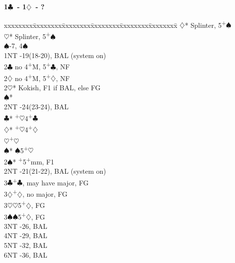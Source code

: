 \documentclass[10pt]{article}
\renewcommand{\c}{$\clubsuit$}
\renewcommand{\d}{$\diamondsuit$}
\newcommand{\h}{$\heartsuit$}
\newcommand{\s}{$\spadesuit$}
\newcommand{\p}{\textsuperscript{+}}
\newenvironment{bidtable}[1][]
{\textbf{#1}
  \begin{adjustwidth}{1em}{}
    \addvspace{2pt}
    \begin{tabbing}
      xxxxxxxx\=xxxxxxxx\=xxxxxxxx\=xxxxxxxx\=xxxxxxxx\=xxxxxxxx\=\kill}
{\end{tabbing}\end{adjustwidth}\bigskip}%
\begin{document}
\begin{multicols*}{2}
\begin{bidtable}[1\c\ - 1\d\ - ?]
     \d* \> Splinter, 5\p\s                    \\
     \h* \> Splinter, 5\p\s                    \\
     \s  {}-7, 4\s                           \\
1NT  -19(18-20), BAL (system on)              \\
2\c  \> no 4\p M, 5\p\c, NF                        \\
2\d  \> no 4\p M, 5\p\d, NF                        \\
2\h* \> Kokish, F1 if BAL, else FG                 \\
     \s* \>                                    \\
     \>      \> 2NT      -24(23-24), BAL      \\
     \>      \c*     {}\p\h 4\p\c            \\
     \>      \d*     {}\p\h 4\p\d            \\
     \>      \h      {}\p\h                  \\
     \>      \s*     {}\s 5\p\h              \\
2\s* {}\p 5\p mm, F1                             \\
2NT  -21(21-22), BAL (system on)              \\
3\c  {}\p\c, may have major, FG                  \\
3\d  {}\p\d, no major, FG                        \\
3\h  {}\h 5\p\d, FG                              \\
3\s  {}\s 5\p\d, FG                              \\
3NT  -26, BAL                                 \\
4NT  -29, BAL                                 \\
5NT  -32, BAL                                 \\
6NT  -36, BAL
\end{bidtable}


\end{multicols*}
\end{document}
